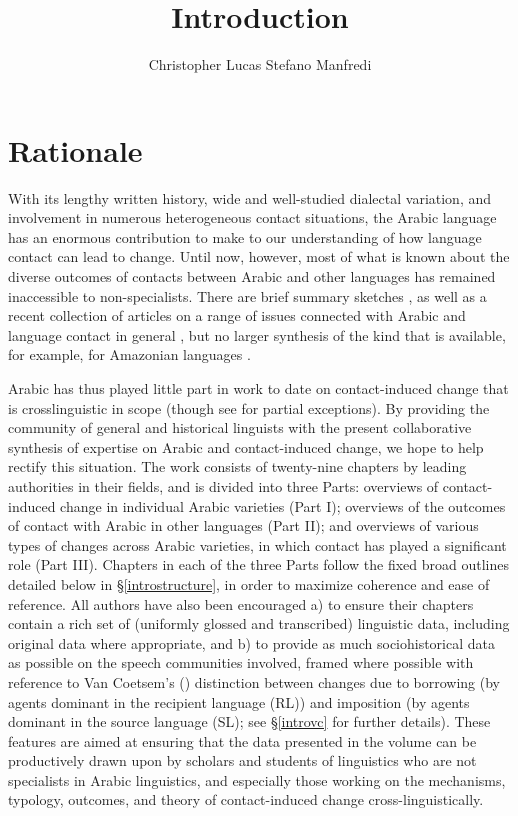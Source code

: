\documentclass[output=paper]{langsci/langscibook}
\author{Christopher Lucas\affiliation{SOAS University of London}\lastand 
 Stefano Manfredi\affiliation{CNRS, SeDyL}
}
\title{Introduction}
\begin{document}
\label{introintro}

\section{Rationale}
With its lengthy written history, wide and well-studied dialectal variation, and involvement in numerous heterogeneous contact situations, the Arabic language has an enormous contribution to make to our understanding of how language contact can lead to change. Until now, however, most of what is known about the diverse outcomes of contacts between Arabic and other languages has remained inaccessible to non-specialists. There are brief summary sketches \citep{Thomason2011,Versteegh2001article,Versteegh2010,Manfredi2018}, as well as a recent collection of articles on a range of issues connected with Arabic and language contact in general \citep{ManfrediTosco2018}, but no larger synthesis of the kind that is available, for example, for Amazonian languages \citep{Aikhenvald2002}.

Arabic has thus played little part in work to date on contact-induced change that is crosslinguistic in
scope (though see \citealt{Matras2009,Trudgill2011} for partial exceptions). By providing the community of general and historical linguists with the present collaborative synthesis of expertise on Arabic and contact-induced change, we hope to help rectify this situation. The work consists of twenty-nine chapters by leading authorities in their fields, and is divided into three Parts: overviews of contact-induced change in individual Arabic varieties (Part I); overviews of the outcomes of contact with Arabic in other languages (Part II); and overviews of various types of changes across Arabic varieties, in which contact has played a significant role (Part III). Chapters in each of the three Parts follow the fixed broad outlines detailed below in §\ref{introstructure}, in order to maximize coherence and ease of reference. All authors have also been encouraged a) to ensure their chapters contain a rich set of (uniformly glossed and transcribed) linguistic data, including original data where appropriate, and b) to provide as much sociohistorical data as possible on the speech communities involved, framed where possible with reference to Van Coetsem’s (\citeyear{VanCoetsem1988,VanCoetsem2000}) distinction between changes due to borrowing (by agents dominant in the recipient language (RL)) and imposition (by agents dominant in the source language (SL); see §\ref{introvc} for further details). These features are aimed at ensuring that the data presented in the volume can be productively drawn upon by scholars and students of linguistics who are not specialists in
Arabic linguistics, and especially those working on the mechanisms, typology, outcomes, and theory of contact-induced change cross-linguistically. 
\end{document}
